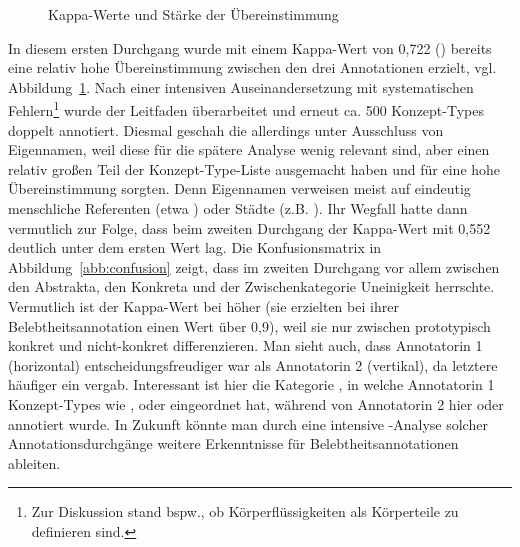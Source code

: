 \begin{figure}
\caption {Kappa-Werte und Stärke der Übereinstimmung \parencite[576]{Artstein2008}\label{abb:kappa-skala}}
\end{figure} 

In diesem ersten Durchgang wurde mit einem Kappa-Wert von 0,722 () bereits eine relativ hohe Übereinstimmung zwischen den drei Annotationen  erzielt, vgl. Abbildung~\ref{abb:kappa-skala}. 
Nach einer intensiven Auseinandersetzung mit systematischen Fehlern\footnote{Zur Diskussion stand bspw., ob Körperflüssigkeiten als Körperteile zu definieren sind.} wurde der Leitfaden überarbeitet und erneut ca. 500 Konzept-Types  doppelt  annotiert. Diesmal geschah die  allerdings unter Ausschluss von Eigennamen, weil diese für die spätere Analyse wenig relevant sind, aber einen relativ großen Teil der Konzept-Type-Liste  ausgemacht haben und für eine hohe Übereinstimmung sorgten. Denn Eigennamen verweisen meist auf eindeutig menschliche Referenten (etwa ) oder Städte (z.B. ).
Ihr Wegfall hatte dann vermutlich zur Folge, dass beim zweiten Durchgang der Kappa-Wert mit 0,552 deutlich unter dem ersten Wert lag. 
Die Konfusionsmatrix in Abbildung~\ref{abb:confusion} zeigt, dass im zweiten Durchgang vor allem zwischen den Abstrakta, den Konkreta und der Zwischenkategorie  Uneinigkeit herrschte. 
Vermutlich ist der Kappa-Wert bei \textcite{Zaenen2004} höher (sie erzielten bei ihrer Belebtheitsannotation  einen Wert über 0,9), weil sie nur zwischen prototypisch konkret und nicht-konkret differenzieren. Man sieht auch, dass Annotatorin 1 (horizontal) entscheidungsfreudiger war als Annotatorin 2 (vertikal), da letztere häufiger ein  vergab. Interessant ist hier die Kategorie , in welche Annotatorin 1 Konzept-Types  wie ,  oder  eingeordnet hat, während von Annotatorin 2 hier  oder  annotiert wurde. In Zukunft könnte man durch eine intensive -Analyse solcher Annotationsdurchgänge  weitere Erkenntnisse für Belebtheitsannotationen  ableiten.  
 
